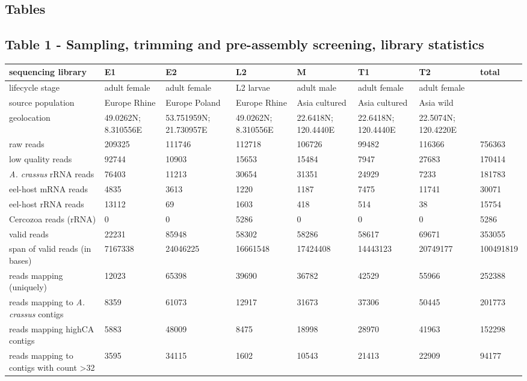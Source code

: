 \documentclass[10pt]{bmc_article}
\newenvironment{bmcformat}{\begin{raggedright}\baselineskip20pt\sloppy\setboolean{publ}{false}}{\end{raggedright}\baselineskip20pt\sloppy}
\begin{document}
\begin{bmcformat}
\newpage

\section*{Tables}
\subsection*{Table 1 - Sampling, trimming and pre-assembly screening,
  library statistics}


\begin{tabular}{p{3.5cm}p{1.5cm}p{1.5cm}p{1.5cm}p{1.5cm}p{1.5cm}p{1.5cm}p{1.5cm}}
   \hline
sequencing library & E1 & E2 & L2 & M & T1 & T2 & total \\ 
   \hline
lifecycle stage & adult female & adult female & L2 larvae & adult male & adult female & adult female &  \\ 
  source population & Europe Rhine & Europe Poland & Europe Rhine & Asia cultured & Asia cultured & Asia wild &  \\ 
  geolocation & 49.0262N; 8.310556E & 53.751959N; 21.730957E & 49.0262N; 8.310556E & 22.6418N; 120.4440E & 22.6418N; 120.4440E & 22.5074N; 120.4220E &  \\ 
  raw reads & 209325 & 111746 & 112718 & 106726 &  99482 & 116366 & 756363 \\ 
  low quality reads & 92744 & 10903 & 15653 & 15484 &  7947 & 27683 & 170414 \\ 
  \textit{A. crassus} rRNA reads & 76403 & 11213 & 30654 & 31351 & 24929 &  7233 & 181783 \\ 
  eel-host mRNA reads &  4835 &  3613 &  1220 &  1187 &  7475 & 11741 & 30071 \\ 
  eel-host rRNA reads & 13112 &    69 &  1603 &   418 &   514 &    38 & 15754 \\ 
  Cercozoa reads (rRNA) &    0 &    0 & 5286 &    0 &    0 &    0 & 5286 \\ 
  valid reads & 22231 & 85948 & 58302 & 58286 & 58617 & 69671 & 353055 \\ 
  span of valid reads (in bases) &  7167338 & 24046225 & 16661548 & 17424408 & 14443123 & 20749177 & 100491819 \\ 
  reads mapping (uniquely) & 12023 & 65398 & 39690 & 36782 & 42529 & 55966 & 252388 \\ 
  reads mapping to \textit{A. crassus} contigs &  8359 & 61073 & 12917 & 31673 & 37306 & 50445 & 201773 \\ 
  reads mapping highCA contigs &  5883 & 48009 &  8475 & 18998 & 28970 & 41963 & 152298 \\ 
  reads mapping to contigs with count >32 &  3595 & 34115 &  1602 & 10543 & 21413 & 22909 & 94177 \\ 
   \hline
\end{tabular}
\newpage


\end{bmcformat}
\end{document}
